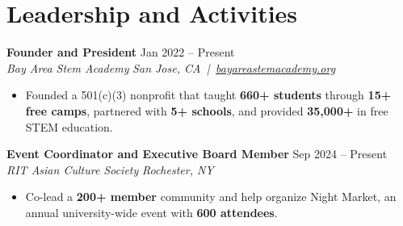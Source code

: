 \documentclass[10pt,letterpaper]{article}
\newif\ifresumeFirstRole
\newcommand{\resumeRole}[4]{%
  \ifresumeFirstRole
    \global\resumeFirstRolefalse
  \else
    \vspace{0pt plus 1fill}%
  \fi
  \textbf{#1} \hfill #2\\
  \textit{#3} \hfill \textit{#4}
}
\begin{document}
\section*{Leadership and Activities}
\resumeRole{Founder and President}{Jan 2022 -- Present}{Bay Area Stem Academy}{San Jose, CA \,|\, \href{https://bayareastemacademy.org}{bayareastemacademy.org}}
\begin{itemize}
  \item Founded a 501(c)(3) nonprofit that taught \textbf{660+ students} through \textbf{15+ free camps}, partnered with \textbf{5+ schools}, and provided \textbf{\textdollar{}35,000+} in free STEM education.
\end{itemize}

\resumeRole{Event Coordinator and Executive Board Member}{Sep 2024 -- Present}{RIT Asian Culture Society}{Rochester, NY}
\begin{itemize}
  \item Co-lead a \textbf{200+ member} community and help organize Night Market, an annual university-wide event with \textbf{600 attendees}.
\end{itemize}
\end{document}

